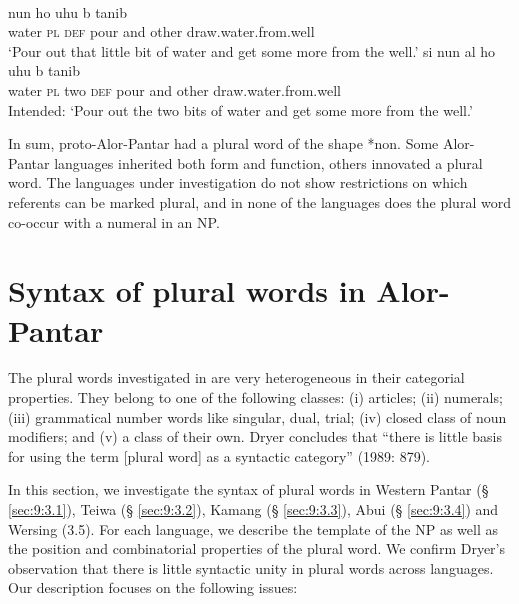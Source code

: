 \ea%
\label{ex:9:11}
 \\
\ea
{} nun ho {\textglotstop}uhu{\textltailn} {\textepsilon}  b{\textepsilon}{\ng} tanib \\
   water \textsc{pl} \textsc{def} pour and other draw.water.from.well  \\
\glt `Pour out that little bit of water and get some more from the well.'
\ex
\gll *s{\textepsilon}{i} nun al{\textopeno} ho {\textglotstop}uhu{\textltailn} {\textepsilon} b{\textepsilon}{\ng} tanib \\
   water \textsc{pl} two \textsc{def} pour and other draw.water.from.well  \\
\glt  Intended: `Pour out the two bits of water and get some more from the well.'
\z
\z

In sum, proto-Alor-Pantar had a plural word of the shape *non. Some Alor-Pantar languages inherited both form and function, others innovated a plural word. The languages under investigation do not show restrictions on which referents can be marked plural, and in none of the languages does the plural word co-occur with a numeral in an NP.

\section{Syntax of plural words in Alor-Pantar}  %

\label{sec:9:3}
The plural words investigated in \citet{Dryer1989} are very heterogeneous in their categorial properties. They belong to one of the following classes: (i) articles; (ii) numerals; (iii) grammatical number words like singular, dual, trial; (iv) closed class of noun modifiers; and (v) a class of their own. Dryer concludes that ``there is little basis for using the term [plural word] as a syntactic category'' (1989: 879).

In this section, we investigate the syntax of plural words in Western Pantar ({\S} \ref{sec:9:3.1}), Teiwa ({\S} \ref{sec:9:3.2}), Kamang ({\S} \ref{sec:9:3.3}), Abui ({\S} \ref{sec:9:3.4}) and Wersing (3.5). For each language, we describe the template of the NP as well as the position and combinatorial properties of the plural word. We confirm Dryer's observation that there is little syntactic unity in plural words across languages. Our description focuses on the following issues:

